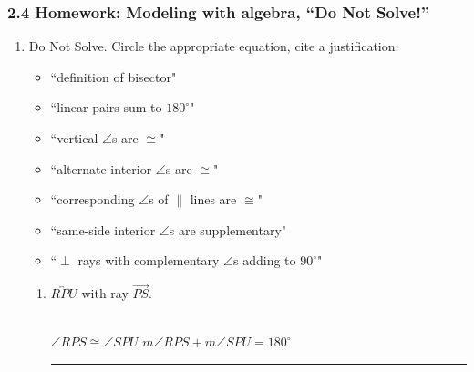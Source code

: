

\fancyhead[LE]{\thepage}



\subsubsection*{2.4 Homework: Modeling with algebra, ``Do Not Solve!''}
\begin{enumerate}

  \item Do Not Solve. Circle the appropriate equation, cite a  justification:
  \begin{multicols}{2}
    \begin{itemize} 
      \item ``definition of bisector" 
      \item ``linear pairs sum to $180^\circ$" 
      \item ``vertical $\angle$s are $\cong$" 
      \item ``alternate interior $\angle$s are $\cong$"
      \item ``corresponding $\angle$s of $\parallel$ lines are $\cong$" 
      \item ``same-side interior $\angle$s are supplementary" 
      \item ``$\perp$ rays  with complementary $\angle$s adding to $90^\circ$" 
    \end{itemize}
  \end{multicols}
  \begin{enumerate}
  \item $\overleftrightarrow{RPU}$ with ray $\overrightarrow{PS}$. \hspace{6cm}
    \\[0.5cm]
    $\angle RPS \cong \angle SPU$ \hspace{0.25cm} $m \angle RPS + m \angle SPU = 180^\circ$ \hspace{0.25cm} \rule{6cm}{0.15mm}  \vspace{0.25cm}


\end{enumerate}
\end{enumerate}
